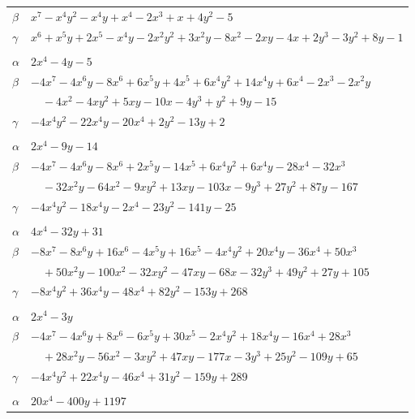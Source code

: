 \documentclass[11pt]{article}
\begin{document}
\begin{longtable}{@{}ll@{}}
$\beta$ & $x^{7}-x^{4}y^{2}-x^{4}y+x^{4}-2x^{3}+x+4y^{2}-5$\\
$\gamma$ & $x^{6}+x^{5}y+2x^{5}-x^{4}y-2x^{2}y^{2}+3x^{2}y-8x^{2}-2xy-4x+2y^{3}-3y^{2}+8y-1$\\
\addlinespace[3pt]
\multicolumn{2}{@{}l}{$\{i,j\}=\{14,23\}$, $k_{ij}=2\cdot 3^{2}$}\\
$\alpha$ & $2x^{4}-4y-5$\\
$\beta$ & $-4x^{7}-4x^{6}y-8x^{6}+6x^{5}y+4x^{5}+6x^{4}y^{2}+14x^{4}y+6x^{4}-2x^{3}-2x^{2}y$\\
 & $\quad -4x^{2}-4xy^{2}+5xy-10x-4y^{3}+y^{2}+9y-15$\\
$\gamma$ & $-4x^{4}y^{2}-22x^{4}y-20x^{4}+2y^{2}-13y+2$\\
\addlinespace[3pt]
\multicolumn{2}{@{}l}{$\{i,j\}=\{14,24\}$, $k_{ij}=2\cdot 3^{2}\cdot 17$}\\
$\alpha$ & $2x^{4}-9y-14$\\
$\beta$ & $-4x^{7}-4x^{6}y-8x^{6}+2x^{5}y-14x^{5}+6x^{4}y^{2}+6x^{4}y-28x^{4}-32x^{3}$\\
 & $\quad -32x^{2}y-64x^{2}-9xy^{2}+13xy-103x-9y^{3}+27y^{2}+87y-167$\\
$\gamma$ & $-4x^{4}y^{2}-18x^{4}y-2x^{4}-23y^{2}-141y-25$\\
\addlinespace[3pt]
\multicolumn{2}{@{}l}{$\{i,j\}=\{15,21\}$, $k_{ij}=2^{2}\cdot 3^{3}\cdot 5$}\\
$\alpha$ & $4x^{4}-32y+31$\\
$\beta$ & $-8x^{7}-8x^{6}y+16x^{6}-4x^{5}y+16x^{5}-4x^{4}y^{2}+20x^{4}y-36x^{4}+50x^{3}$\\
 & $\quad +50x^{2}y-100x^{2}-32xy^{2}-47xy-68x-32y^{3}+49y^{2}+27y+105$\\
$\gamma$ & $-8x^{4}y^{2}+36x^{4}y-48x^{4}+82y^{2}-153y+268$\\
\addlinespace[3pt]
\multicolumn{2}{@{}l}{$\{i,j\}=\{15,22\}$, $k_{ij}=2\cdot 5\cdot 13$}\\
$\alpha$ & $2x^{4}-3y$\\
$\beta$ & $-4x^{7}-4x^{6}y+8x^{6}-6x^{5}y+30x^{5}-2x^{4}y^{2}+18x^{4}y-16x^{4}+28x^{3}$\\
 & $\quad +28x^{2}y-56x^{2}-3xy^{2}+47xy-177x-3y^{3}+25y^{2}-109y+65$\\
$\gamma$ & $-4x^{4}y^{2}+22x^{4}y-46x^{4}+31y^{2}-159y+289$\\
\addlinespace[3pt]
\multicolumn{2}{@{}l}{$\{i,j\}=\{15,23\}$, $k_{ij}=2\cdot 13^{2}\cdot 17$}\\
$\alpha$ & $20x^{4}-400y+1197$\\

\end{longtable}
\end{document}
